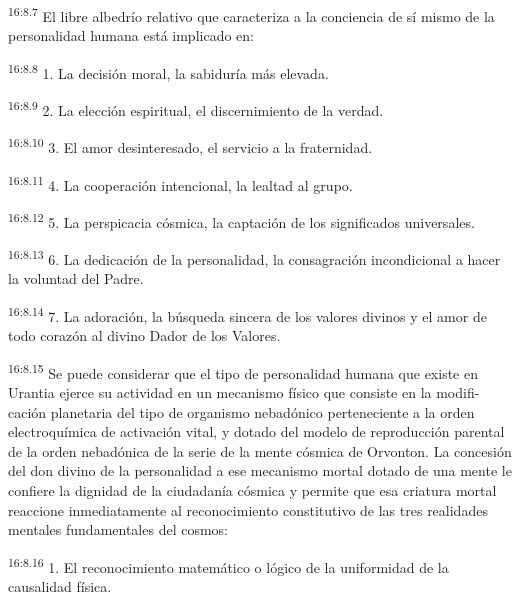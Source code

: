 \par
\textsuperscript{16:8.7} El libre albedrío relativo que caracteriza a la conciencia de sí mismo de la personalidad humana está implicado en:

\par
\textsuperscript{16:8.8} 1. La decisión moral, la sabiduría más elevada.

\par
\textsuperscript{16:8.9} 2. La elección espiritual, el discernimiento de la verdad.

\par
\textsuperscript{16:8.10} 3. El amor desinteresado, el servicio a la fraternidad.

\par
\textsuperscript{16:8.11} 4. La cooperación intencional, la lealtad al grupo.

\par
\textsuperscript{16:8.12} 5. La perspicacia cósmica, la captación de los significados universales.

\par
\textsuperscript{16:8.13} 6. La dedicación de la personalidad, la consagración incondicional a hacer la voluntad del Padre.

\par
\textsuperscript{16:8.14} 7. La adoración, la búsqueda sincera de los valores divinos y el amor de todo corazón al divino Dador de los Valores.

\par
\textsuperscript{16:8.15} Se puede considerar que el tipo de personalidad humana que existe en Urantia ejerce su actividad en un mecanismo físico que consiste en la modifi-cación planetaria del tipo de organismo nebadónico perteneciente a la orden electroquímica de activación vital, y dotado del modelo de reproducción parental de la orden nebadónica de la serie de la mente cósmica de Orvonton. La concesión del don divino de la personalidad a ese mecanismo mortal dotado de una mente le confiere la dignidad de la ciudadanía cósmica y permite que esa criatura mortal reaccione inmediatamente al reconocimiento constitutivo de las tres realidades mentales fundamentales del cosmos:

\par
\textsuperscript{16:8.16} 1. El reconocimiento matemático o lógico de la uniformidad de la causalidad física.

